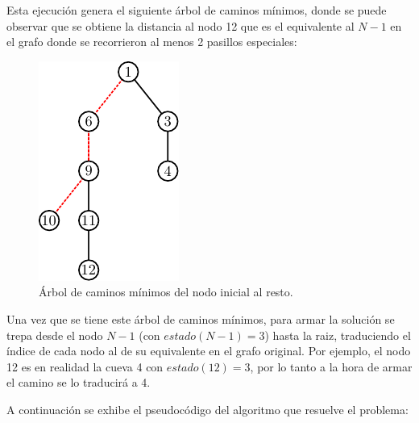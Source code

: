 	Esta ejecución genera el siguiente árbol de caminos mínimos, donde se puede
	observar que se obtiene la distancia al nodo 12 que es el equivalente al $N
	- 1$ en el grafo donde se recorrieron al menos 2 pasillos especiales:

	\begin{figure}[H]
		\centering
		\includegraphics{imagenes/ej1_modelo_3.pdf}
		\caption{Árbol de caminos mínimos del nodo inicial al resto.}
	\end{figure}

	Una vez que se tiene este árbol de caminos mínimos, para armar la solución se trepa
	desde el nodo $N - 1$ (con $estado(N - 1) = 3$) hasta la
	raiz, traduciendo el índice de cada nodo al de su equivalente en el grafo
	original. Por ejemplo, el nodo 12 es en realidad la cueva 4 con $estado(12) =
	3$, por lo tanto a la hora de armar el camino se lo traducirá a 4.

    A continuación se exhibe el pseudocódigo del algoritmo que resuelve el problema:

